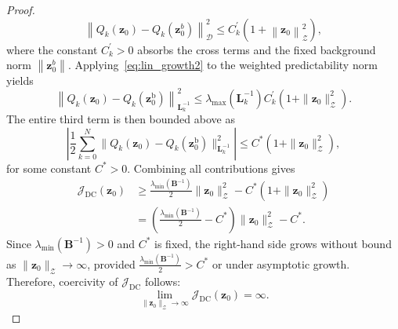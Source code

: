 \documentclass[10pt,a4paper]{amsart}
\begin{document}
\begin{proof}
\begin{equation}
\left\|Q_k\left(\mathbf{z}_0\right)-Q_k\left(\mathbf{z}_0^b\right)\right\|_{\mathcal{D}}^2 \leq C_k^{\prime}\left(1+\left\|\mathbf{z}_0\right\|_{\mathcal{Z}}^2\right),     \label{eq:lin_growth2}
\end{equation}
where the constant $ C_k^{\prime} > 0 $ absorbs the cross terms and the fixed background norm $ \left\| \mathbf{z}_0^b \right\| $.
Applying~\eqref{eq:lin_growth2} to the weighted predictability norm yields
\begin{equation}
\left\| Q_k(\mathbf{z}_0) - Q_k(\mathbf{z}_0^{\mathrm{b}}) \right\|_{\mathbf{L}^{-1}_k}^2 \leq \lambda_{\max }\left(\mathbf{L}_k^{-1}\right)C^{\prime}_k(1 + \| \mathbf{z}_0 \|_{\mathcal{Z}}^2).
\end{equation}
The entire third term is then bounded above as
\begin{equation}
\left| \frac{1}{2} \sum_{k=0}^N \| Q_k(\mathbf{z}_0) - Q_k(\mathbf{z}_0^{\mathrm{b}}) \|_{\mathbf{L}^{-1}_k}^2 \right| \leq C^{*} (1 + \| \mathbf{z}_0 \|_{\mathcal{Z}}^2),
\end{equation}
for some constant $ C^{*} > 0 $. Combining all contributions gives
\begin{equation}
\begin{split}
\mathcal{J}_{\mathrm{DC}}(\mathbf{z}_0) 
    &\geq \frac{\lambda_{\min}\!\left(\mathbf{B}^{-1}\right)}{2} 
        \| \mathbf{z}_0 \|_{\mathcal{Z}}^2 
        - C^{*}\!\left(1 + \| \mathbf{z}_0 \|_{\mathcal{Z}}^2\right) \\
    &= \left( \frac{\lambda_{\min}\!\left(\mathbf{B}^{-1}\right)}{2} - C^{*} \right) 
        \| \mathbf{z}_0 \|_{\mathcal{Z}}^2 - C^{*}.
\end{split}
\end{equation}
Since $ \lambda_{\min}\left(\mathbf{B}^{-1}\right) > 0 $ and $ C^{*} $ is fixed, the right-hand side grows without bound as $ \| \mathbf{z}_0 \|_{\mathcal{Z}} \to \infty $, provided $ \frac{\lambda_{\min}\left(\mathbf{B}^{-1}\right)}{2} > C^{*} $ or under asymptotic growth. Therefore, coercivity of $ \mathcal{J}_{\mathrm{DC}} $ follows:
\begin{equation}
\lim_{\| \mathbf{z}_0 \|_{\mathcal{Z}} \to \infty} \mathcal{J}_{\mathrm{DC}}(\mathbf{z}_0) = \infty.
\end{equation}
\end{proof}
\end{document}
